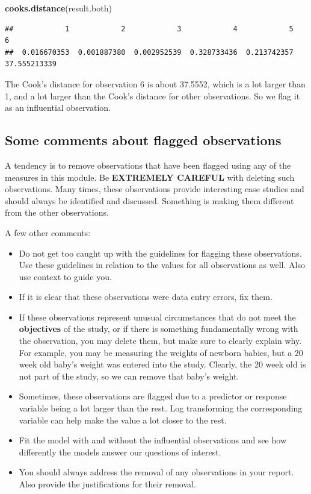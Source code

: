 \documentclass[
]{book}
\newenvironment{Shaded}{\begin{snugshade}}{\end{snugshade}}
\newcommand{\FunctionTok}[1]{\textcolor[rgb]{0.13,0.29,0.53}{\textbf{#1}}}
\newcommand{\NormalTok}[1]{#1}
\providecommand{\tightlist}{%
  \setlength{\itemsep}{0pt}\setlength{\parskip}{0pt}}
\begin{document}
\begin{Shaded}
\begin{Highlighting}[]
\FunctionTok{cooks.distance}\NormalTok{(result.both)}
\end{Highlighting}
\end{Shaded}

\begin{verbatim}
##            1            2            3            4            5            6 
##  0.016670353  0.001887380  0.002952539  0.328733436  0.213742357 37.555213339
\end{verbatim}

The Cook's distance for observation 6 is about 37.5552, which is a lot larger than 1, and a lot larger than the Cook's distance for other observations. So we flag it as an influential observation.

\hypertarget{some-comments-about-flagged-observations}{%
\subsection{Some comments about flagged observations}\label{some-comments-about-flagged-observations}}

A tendency is to remove observations that have been flagged using any of the measures in this module. Be \textbf{EXTREMELY CAREFUL} with deleting such observations. Many times, these observations provide interesting case studies and should always be identified and discussed. Something is making them different from the other observations.

A few other comments:

\begin{itemize}
\tightlist
\item
  Do not get too caught up with the guidelines for flagging these observations. Use these guidelines in relation to the values for all observations as well. Also use context to guide you.
\item
  If it is clear that these observations were data entry errors, fix them.
\item
  If these observations represent unusual circumstances that do not meet the \textbf{objectives} of the study, or if there is something fundamentally wrong with the observation, you may delete them, but make sure to clearly explain why. For example, you may be measuring the weights of newborn babies, but a 20 week old baby's weight was entered into the study. Clearly, the 20 week old is not part of the study, so we can remove that baby's weight.
\item
  Sometimes, these observations are flagged due to a predictor or response variable being a lot larger than the rest. Log transforming the corresponding variable can help make the value a lot closer to the rest.
\item
  Fit the model with and without the influential observations and see how differently the models answer our questions of interest.
\item
  You should always address the removal of any observations in your report. Also provide the justifications for their removal.
\end{itemize}
\end{document}
